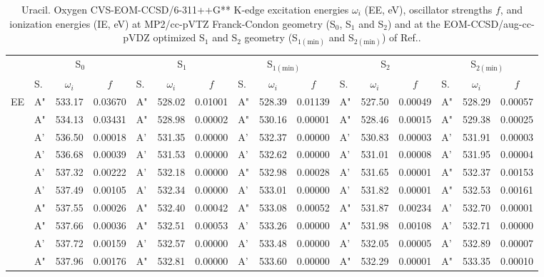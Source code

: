 \documentclass[journal=jctcce,manuscript=article]{achemso}
\begin{document}
\begin{table}
\caption{Uracil.  Oxygen CVS-EOM-CCSD/6-311++G** K-edge excitation energies $\omega_i$ (EE, eV), oscillator strengths $f$, and ionization energies (IE, eV) at MP2/cc-pVTZ Franck-Condon geometry (S$_0$, S$_1$ and S$_2$) and at the EOM-CCSD/aug-cc-pVDZ optimized S$_1$ and S$_2$ geometry (S$_{1(\text{min})}$ and S$_{2(\text{min})}$) of Ref..
\label{Tab:Uracil}}
\scriptsize
\begin{tabular}{l|lcc|lcc|lcc|lcc|lcc}
\cline{2-16}
& \multicolumn{3}{c|}{S$_0$}
& \multicolumn{3}{c|}{S$_1$}  
& \multicolumn{3}{c|}{S$_{1(\text{min})}$}
& \multicolumn{3}{c|}{S$_2$}
& \multicolumn{3}{c}{S$_{2(\text{min})}$}
\\
\cline{2-16}
& S. & $\omega_i$ & $f$ 
& S. & $\omega_i$ & $f$ 
& S. & $\omega_i$ & $f$ 
& S. & $\omega_i$ & $f$ 
& S. & $\omega_i$ & $f$\\
\hline
  EE 
 &  A"  &  533.17  &  0.03670 & A" & 528.02 & 0.01001 & A" & 528.39 & 0.01139 & A" & 527.50 & 0.00049 & A" & 528.29 & 0.00057 \\ 
 &  A"  &  534.13  &  0.03431 & A" & 528.98 & 0.00002 & A" & 530.16 & 0.00001 & A" & 528.46 & 0.00015 & A" & 529.38 & 0.00025 \\ 
 &  A'  &  536.50  &  0.00018 & A' & 531.35 & 0.00000 & A' & 532.37 & 0.00000 & A' & 530.83 & 0.00003 & A' & 531.91 & 0.00003 \\ 
 &  A'  &  536.68  &  0.00039 & A' & 531.53 & 0.00000 & A' & 532.62 & 0.00000 & A' & 531.01 & 0.00008 & A' & 531.95 & 0.00004 \\ 
 &  A'  &  537.32  &  0.00222 & A' & 532.18 & 0.00000 & A" & 532.98 & 0.00028 & A' & 531.65 & 0.00001 & A" & 532.37 & 0.00153 \\ 
 &  A'  &  537.49  &  0.00105 & A' & 532.34 & 0.00000 & A' & 533.01 & 0.00000 & A' & 531.82 & 0.00001 & A" & 532.53 & 0.00161 \\ 
 &  A"  &  537.55  &  0.00026 & A" & 532.40 & 0.00042 & A" & 533.08 & 0.00052 & A" & 531.87 & 0.00234 & A' & 532.70 & 0.00001 \\ 
 &  A"  &  537.66  &  0.00036 & A" & 532.51 & 0.00053 & A' & 533.26 & 0.00000 & A" & 531.98 & 0.00108 & A' & 532.71 & 0.00000 \\ 
 &  A'  &  537.72  &  0.00159 & A' & 532.57 & 0.00000 & A' & 533.48 & 0.00000 & A' & 532.05 & 0.00005 & A' & 532.89 & 0.00007 \\ 
 &  A"  &  537.96  &  0.00176 & A" & 532.81 & 0.00000 & A' & 533.60 & 0.00000 & A" & 532.29 & 0.00001 & A" & 533.35 & 0.00010 \\ 

\end{tabular}
\end{table}
\end{document}
